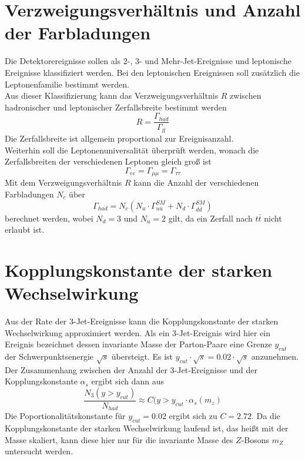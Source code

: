 \documentclass{include/thesisclass3}
\newcommand{\cc}{\cdot}
\begin{document}
\section{Verzweigungsverhältnis und Anzahl der Farbladungen}
Die Detektorereignisse sollen als $2$-, $3$- und Mehr-Jet-Ereignisse und leptonische Ereignisse klassifiziert werden. Bei den leptonischen Ereignissen soll zusätzlich die Leptonenfamilie bestimmt werden.\\
Aus dieser Klassifizierung kann das Verzweigungsverhältnis $R$ zwischen hadronischer und leptonischer Zerfallsbreite bestimmt werden
\[ R = \frac{ \Gamma_{had}}{\Gamma_{l\bar l}}\]
Die Zerfallsbreite ist allgemein proportional zur Ereignisanzahl.\\
Weiterhin soll die Leptonenuniversalität überprüft werden, wonach die Zerfallsbreiten der verschiedenen Leptonen gleich groß ist
\[ \Gamma_{ee} = \Gamma_{\mu\mu} = \Gamma_{\tau\tau}\]
Mit dem Verzweigungsverhältnis $R$ kann die Anzahl der verschiedenen Farbladungen $N_c$ über
\[ \Gamma_{had} = N_c \left( N_u \cc \Gamma_{u\bar u}^{SM} + N_d \cc \Gamma_{d \bar d}^{SM}\right)\]
berechnet werden, wobei $N_d = 3$ und $N_u = 2$ gilt, da ein Zerfall nach $t \bar t$ nicht erlaubt ist. 

\section{Kopplungskonstante der starken Wechselwirkung}
Aus der Rate der $3$-Jet-Ereignisse kann die Kopplungskonstante der starken Wechselwirkung approximiert werden. Als ein $3$-Jet-Ereignis wird hier ein Ereignis bezeichnet dessen invariante Masse der Parton-Paare eine Grenze $y_{cut}$ der Schwerpunktsenergie $\sqrt{s}$ übersteigt. Es ist $y_{cut}\cc \sqrt{s} = 0.02 \cc \sqrt{s}$ anzunehmen. Der Zusammenhang zwischen der Anzahl der $3$-Jet-Ereignisse und der Kopplungskonstante $\alpha_s$ ergibt sich dann aus
\[ \frac{N_3(y > y_{cut})}{N_{had}} \approx C(y > y_{cut} \cc \alpha_s(m_z)\]
Die Poportionalitätskonstante für $y_{cut} = 0.02$ ergibt sich zu $C = 2.72$. Da die Kopplungskonstante der starken Wechselwirkung laufend ist, das heißt mit der Masse skaliert, kann diese hier nur für die invariante Masse des $Z$-Bosons $m_Z$ untersucht werden.
\end{document}
